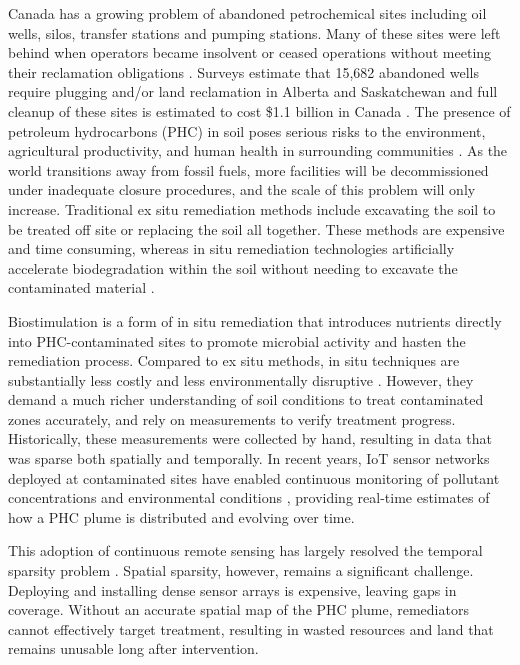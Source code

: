 \label{chapter:introduction}

Canada has a growing problem of abandoned petrochemical sites including oil wells, silos, transfer stations and pumping stations. Many of these sites were left behind when operators became insolvent or ceased operations without meeting their reclamation obligations \cite{canadaEnergy_report_new}. Surveys estimate that 15,682 abandoned wells require plugging and/or land reclamation in Alberta and Saskatchewan and full cleanup of these sites is estimated to cost \$1.1 billion in Canada \cite{est_cost_of_cleaning_canada}. The presence of petroleum hydrocarbons (PHC) in soil poses serious risks to the environment, agricultural productivity, and human health in surrounding communities \cite{PHCBadForCrops,PHCBadForHumans,PHCBadForEnv}. As the world transitions away from fossil fuels, more facilities will be decommissioned under inadequate closure procedures, and the scale of this problem will only increase. Traditional ex situ remediation methods include excavating the soil to be treated off site or replacing the soil all together. These methods are expensive and time consuming, whereas in situ remediation technologies artificially accelerate biodegradation within the soil without needing to excavate the contaminated material \cite{remTechReview}. 

Biostimulation is a form of in situ remediation that introduces nutrients directly into PHC-contaminated sites to promote microbial activity and hasten the remediation process. Compared to ex situ methods, in situ techniques are substantially less costly and less environmentally disruptive \cite{LioraTech}. However, they demand a much richer understanding of soil conditions to treat contaminated zones accurately, and rely on measurements to verify treatment progress. Historically, these measurements were collected by hand, resulting in data that was sparse both spatially and temporally. In recent years, IoT sensor networks deployed at contaminated sites have enabled continuous monitoring of pollutant concentrations and environmental conditions \cite{LioraRemoteSensing,atmMeasInSoil}, providing real-time estimates of how a PHC plume is distributed and evolving over time.

This adoption of continuous remote sensing has largely resolved the temporal sparsity problem \cite{LioraRemoteSensing}. Spatial sparsity, however, remains a significant challenge. Deploying and installing dense sensor arrays is expensive, leaving gaps in coverage. Without an accurate spatial map of the PHC plume, remediators cannot effectively target treatment, resulting in wasted resources and land that remains unusable long after intervention.

